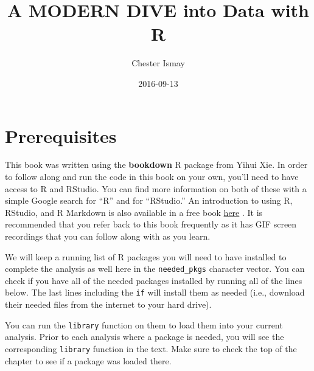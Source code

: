\documentclass[]{tufte-book}
\title{A MODERN DIVE into Data with R}
\author{Chester Ismay}
\date{2016-09-13}
\newenvironment{Shaded}{\begin{snugshade}}{\end{snugshade}}
\newcommand{\KeywordTok}[1]{\textcolor[rgb]{0.13,0.29,0.53}{\textbf{{#1}}}}
\newcommand{\DataTypeTok}[1]{\textcolor[rgb]{0.13,0.29,0.53}{{#1}}}
\newcommand{\StringTok}[1]{\textcolor[rgb]{0.31,0.60,0.02}{{#1}}}
\newcommand{\NormalTok}[1]{{#1}}
\begin{document}
\let\allcaps=\relax
\maketitle



{
\setcounter{tocdepth}{1}
\tableofcontents
}

\chapter{Prerequisites}\label{prereqs}

This book was written using the \textbf{bookdown} R package from Yihui
Xie. In order to follow along and run the code in this book on your own,
you'll need to have access to R and RStudio. You can find more
information on both of these with a simple Google search for ``R'' and
for ``RStudio.'' An introduction to using R, RStudio, and R Markdown is
also available in a free book
\href{http://ismayc.github.io/rbasics-book}{here} \citep{usedtor2016}.
It is recommended that you refer back to this book frequently as it has
GIF screen recordings that you can follow along with as you learn.

We will keep a running list of R packages you will need to have
installed to complete the analysis as well here in the
\texttt{needed\_pkgs} character vector. You can check if you have all of
the needed packages installed by running all of the lines below. The
last lines including the \texttt{if} will install them as needed (i.e.,
download their needed files from the internet to your hard drive).

You can run the \texttt{library} function on them to load them into your
current analysis. Prior to each analysis where a package is needed, you
will see the corresponding \texttt{library} function in the text. Make
sure to check the top of the chapter to see if a package was loaded
there.

\begin{Shaded}
\end{Shaded}
\end{document}
